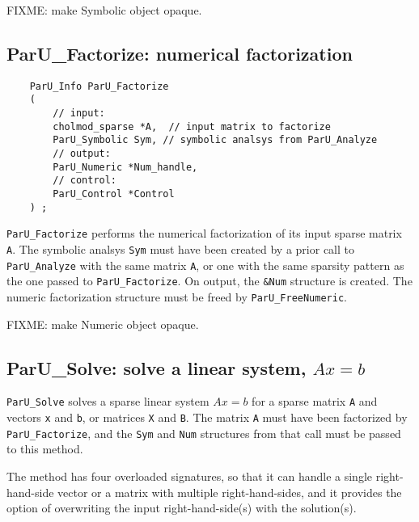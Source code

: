\documentclass[12pt]{article}
\begin{document}
    FIXME: make Symbolic object opaque.

\subsection{{\sf ParU\_Factorize}: numerical factorization}

    {\footnotesize
    \begin{verbatim}
    ParU_Info ParU_Factorize
    (
        // input:
        cholmod_sparse *A,  // input matrix to factorize
        ParU_Symbolic Sym, // symbolic analsys from ParU_Analyze
        // output:
        ParU_Numeric *Num_handle,
        // control:
        ParU_Control *Control
    ) ; \end{verbatim}}

    \verb'ParU_Factorize' performs the numerical factorization of its input
    sparse matrix \verb'A'.  The symbolic analsys \verb'Sym' must have been
    created by a prior call to \verb'ParU_Analyze' with the same matrix
    \verb'A', or one with the same sparsity pattern as the one passed to
    \verb'ParU_Factorize'.  On output, the \verb'&Num' structure is created.
    The numeric factorization structure must be freed by
    \verb'ParU_FreeNumeric'.

    FIXME: make Numeric object opaque.

\subsection{{\sf ParU\_Solve}: solve a linear system, $Ax=b$}

    \verb'ParU_Solve' solves a sparse linear system $Ax=b$ for a sparse
    matrix \verb'A' and vectors \verb'x' and \verb'b', or matrices
    \verb'X' and \verb'B'.  The matrix \verb'A' must have been factorized
    by \verb'ParU_Factorize', and the \verb'Sym' and \verb'Num' structures
    from that call must be passed to this method.

    The method has four overloaded signatures, so that it can handle a single
    right-hand-side vector or a matrix with multiple right-hand-sides, and it
    provides the option of overwriting the input right-hand-side(s) with the
    solution(s).
\end{document}

